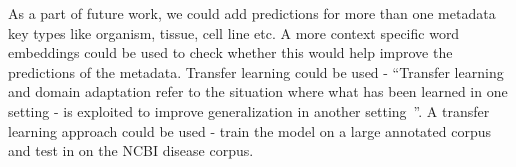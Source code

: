 As a part of future work, we could add predictions for more than one metadata key types like organism, tissue, cell line etc. A more context specific word embeddings could be used to check whether this would help improve the predictions of the metadata. Transfer learning could be used - ``Transfer learning and domain adaptation refer to the situation where what has been learned in one setting - is exploited to improve generalization in another setting~\cite{Goodfellow-et-al-2016}''. A transfer learning approach could be used - train the model on a large annotated corpus and test in on the NCBI disease corpus. 







